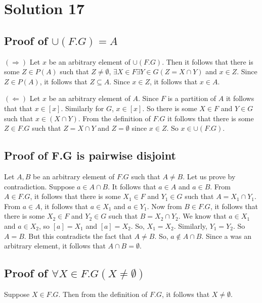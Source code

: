 \documentclass{article}
\begin{document}
\section{Solution 17}
\subsection{Proof of $\cup (F.G) = A$}
$(\Rightarrow)$ Let $x$ be an arbitrary element of $\cup (F.G)$. Then
it follows that there is some $Z \in P(A)$ such that $Z \neq
\emptyset$, $\exists X \in F \exists Y \in G(Z = X \cap Y)$ and $x
\in Z$. Since $Z \in P(A)$, it follows that $Z \subseteq A$. Since $x
\in Z$, it follows that $x \in A$.

$(\Leftarrow)$ Let $x$ be an arbitrary element of $A$. Since $F$ is a
partition of $A$ it follows that that $x \in [x]$. Similarly for $G$,
$x \in [x]$. So there is some $X \in F$ and $Y \in G$ such that
$x \in (X \cap Y)$. From the definition of $F.G$ it follows that there
is some $Z \in F.G$ such that $Z = X \cap Y$ and $Z = \emptyset$ since
$x \in Z$. So $x \in \cup(F.G)$.

\subsection{Proof of F.G is pairwise disjoint}
Let $A,B$ be an arbitrary element of $F.G$ such that $A \neq B$. Let
us prove by contradiction. Suppose $a \in A \cap B$. It follows that
$a \in A$ and $a \in B$. From $A \in F.G$, it follows that there is
some $X_1 \in F$ and $Y_1 \in G$ such that $A = X_1 \cap Y_1$. From $a
\in A$, it follows that $a \in X_1$ and $a \in Y_1$. Now from $B \in
F.G$, it follows that there is some $X_2 \in F$ and $Y_2 \in G$ such
that $B = X_2 \cap Y_2$. We know that $a \in X_1$ and $a \in X_2$, so
$[a] = X_1$ and $[a] = X_2$. So, $X_1 = X_2$. Similarly, $Y_1 = Y_2$.
So $A = B$. But this contradicts the fact that $A \neq B$. So, $a
\notin A \cap B$. Since a was an arbitrary element, it follows that $A
\cap B = \emptyset$.

\subsection{Proof of $\forall X \in F.G(X \neq \emptyset)$}
Suppose $X \in F.G$. Then from the definition of $F.G$, it follows
that $X \neq \emptyset$.
\end{document}
